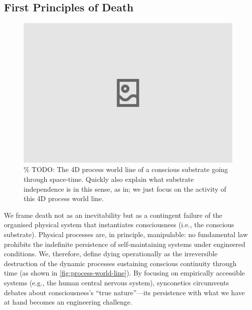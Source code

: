 \documentclass[10pt]{article}
\begin{document}
\begin{sloppypar}
  \subsection{First Principles of Death}
  \label{sec:first-principles}

  \begin{figure}[ht!]
    \centering
    \includegraphics[width=\textwidth]{figures/4D-process-world-line.png}
    \caption{\% TODO: The 4D process world line of a conscious substrate going through space-time. Quickly also explain what substrate independence is in this sense, as in; we just focus on the activity of this 4D process world line.}
    \label{fig:process-world-line}
  \end{figure}

  We frame death not as an inevitability but as a contingent failure of the organised physical system that instantiates consciousness (i.e., the conscious substrate). Physical processes are, in principle, manipulable: no fundamental law prohibits the indefinite persistence of self-maintaining systems under engineered conditions. We, therefore, define dying operationally as the irreversible destruction of the dynamic processes sustaining conscious continuity through time (as shown in \autoref{fig:process-world-line}). By focusing on empirically accessible systems (e.g., the human central nervous system), synconetics circumvents debates about consciousness’s “true nature”—its persistence with what we have at hand becomes an engineering challenge.


\end{sloppypar}
\end{document}
